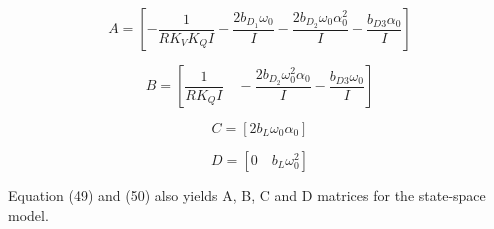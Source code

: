 \begin{equation}
    A = \left[-\frac{1}{RK_VK_QI}-\frac{2b_D_1\omega_0}{I}-\frac{2b_D_2\omega_0\alpha_0^2}{I}-\frac{b_{D3}\alpha_0}{I}\right]
\end{equation}

\begin{equation}
    B = \left[\frac{1}{RK_QI}\quad - \frac{2b_D_2\omega_0^2\alpha_0}{I} - \frac{b_{D3}\omega_0}{I}  \right]
\end{equation}

\begin{equation}
    C = \left[2b_L\omega_0\alpha_0 \right]
\end{equation}

\begin{equation}
    D = \left[0\quad b_L\omega_0^2\right]
\end{equation}

Equation (49) and (50) also yields A, B, C and D matrices for the state-space model. 

